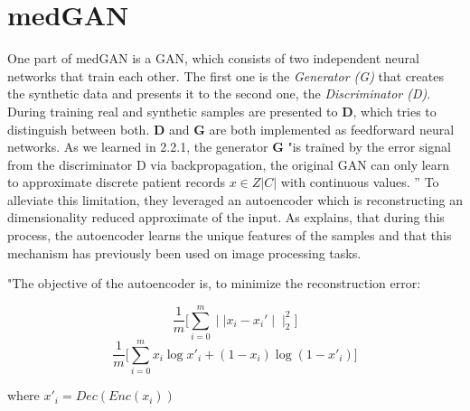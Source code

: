 \documentclass[11pt, a4paper]{book}
\begin{document}
\section{medGAN}
One part of medGAN is a GAN, which consists of two independent neural networks that train each other. The first one is the \textit{Generator (G)} that creates the synthetic data and presents it to the second one, the \textit{Discriminator (D)}. During training real and synthetic samples are presented to \textbf{D}, which tries to distinguish between both.
\textbf{D} and \textbf{G} are both implemented as feedforward neural networks.
As we learned in 2.2.1, the generator \textbf{G} "is trained by the error signal from the discriminator D via backpropagation, the original GAN can only learn to approximate discrete patient records $x \in Z|C|$ with continuous values. ” \cite{Choi2017}
To alleviate this limitation, they leveraged an autoencoder which is reconstructing an dimensionality reduced approximate of the input. As \cite{Choi2017} explains, that during this process, the autoencoder learns the unique features of the samples and that this mechanism has previously been used on image processing tasks.

"The objective of the autoencoder is, to minimize the reconstruction error:

\begin{equation}
\frac{1}{m}\big[\sum_{i=0}^m \mid\mid x_i - x_i'\mid\mid_2^2]
\end{equation}
\begin{equation}
\frac{1}{m}\big[\sum_{i=0}^m x_i \log x'_i + (1-x_i) \log (1-x'_i)]
\end{equation} 
\begin{center}
where $x'_i = Dec(Enc(x_i))$
\end{center}
\end{document}
